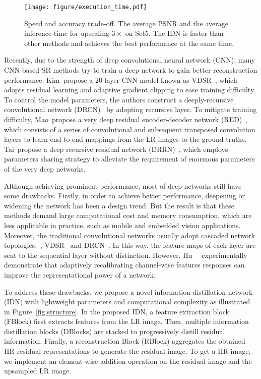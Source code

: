 \documentclass[10pt,twocolumn,letterpaper]{article}
\begin{document}
\begin{figure}[!t]
	\begin{center}
		\texttt{[image: figure/execution\_time.pdf]}
	\end{center}
	\caption{Speed and accuracy trade-off. The average PSNR and the average inference time for upscaling $3 \times$ on Set5. The IDN is faster than other methods and achieves the best performance at the same time.}
	\label{fig:execution_time}
\end{figure}

Recently, due to the strength of deep convolutional neural network (CNN), many CNN-based SR methods try to train a deep network to gain better reconstruction performance. Kim~\etal propose a 20-layer CNN model known as VDSR~\cite{VDSR}, which adopts residual learning and adaptive gradient clipping to ease training difficulty. To control the model parameters, the authors construct a deeply-recursive convolutional network (DRCN)~\cite{DRCN} by adopting recursive layer. To mitigate training difficulty, Mao~\etal propose a very deep residual encoder-decoder network (RED)~\cite{RED}, which consists of a series of convolutional and subsequent transposed convolution layers to learn end-to-end mappings from the LR images to the ground truths. Tai~\etal propose a deep recursive residual network (DRRN)~\cite{DRRN}, which employs parameters sharing strategy to alleviate the requirement of enormous parameters of the very deep networks.

Although achieving prominent performance, most of deep networks still have some drawbacks. Firstly, in order to achieve better performance, deepening or widening the network has been a design trend. But the result is that these methods demand large computational cost and memory consumption, which are less applicable in practice, such as mobile and embedded vision applications. Moreover, the traditional convolutional networks usually adopt cascaded network topologies,~\eg, VDSR~\cite{VDSR} and DRCN~\cite{DRCN}. In this way, the feature maps of each layer are sent to the sequential layer without distinction. However, Hu~\etal~\cite{SENet} experimentally demonstrate that adaptively recalibrating channel-wise features responses can improve the representational power of a network.

To address these drawbacks, we propose a novel information distillation network (IDN) with lightweight parameters and computational complexity as illustrated in Figure~\ref{fig:structure}. In the proposed IDN, a feature extraction block (FBlock) first extracts features from the LR image. Then, multiple information distillation blocks (DBlocks) are stacked to progressively distill residual information. Finally, a reconstruction Block (RBlock) aggregates the obtained HR residual representations to generate the residual image. To get a HR image, we implement an element-wise addition operation on the residual image and the upsampled LR image.
\end{document}
